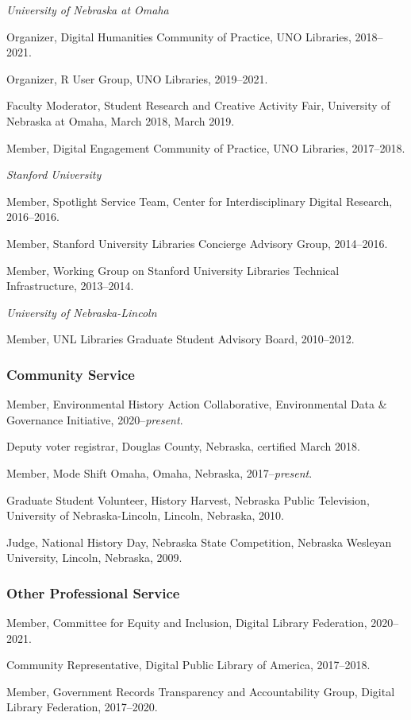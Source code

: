 \vspace{.4cm}

\emph{University of Nebraska at Omaha}

Organizer, Digital Humanities Community of Practice, UNO Libraries,
2018--2021.

Organizer, R User Group, UNO Libraries, 2019--2021.

Faculty Moderator, Student Research and Creative Activity Fair,
University of Nebraska at Omaha, March 2018, March 2019.

Member, Digital Engagement Community of Practice, UNO Libraries,
2017--2018.

\vspace{.4cm}

\emph{Stanford University}

Member, Spotlight Service Team, Center for Interdisciplinary Digital
Research, 2016--2016.

Member, Stanford University Libraries Concierge Advisory Group,
2014--2016.

Member, Working Group on Stanford University Libraries Technical
Infrastructure, 2013--2014.

\vspace{.4cm}

\emph{University of Nebraska-Lincoln}

Member, UNL Libraries Graduate Student Advisory Board, 2010--2012.

\hypertarget{community-service}{%
\subsubsection{Community Service}\label{community-service}}

Member, Environmental History Action Collaborative, Environmental Data
\& Governance Initiative, 2020--\emph{present}.

Deputy voter registrar, Douglas County, Nebraska, certified March 2018.

Member, Mode Shift Omaha, Omaha, Nebraska, 2017--\emph{present}.

Graduate Student Volunteer, History Harvest, Nebraska Public Television,
University of Nebraska-Lincoln, Lincoln, Nebraska, 2010.

Judge, National History Day, Nebraska State Competition, Nebraska
Wesleyan University, Lincoln, Nebraska, 2009.

\hypertarget{other-professional-service}{%
\subsubsection{Other Professional
Service}\label{other-professional-service}}

Member, Committee for Equity and Inclusion, Digital Library Federation,
2020--2021.

Community Representative, Digital Public Library of America, 2017--2018.

Member, Government Records Transparency and Accountability Group,
Digital Library Federation, 2017--2020.
